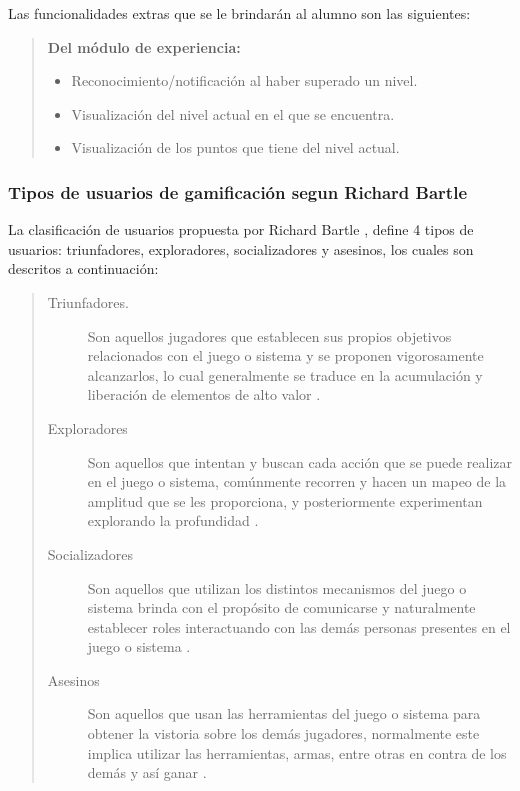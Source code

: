     \noindent
    Las funcionalidades extras que se le brindarán al alumno son las siguientes:

    \begin{quote}
    {\bf Del módulo de experiencia:}
        \begin{itemize}
        \item Reconocimiento/notificación al haber superado un nivel.
        \item Visualización del nivel actual en el que se encuentra.
        \item Visualización de los puntos que tiene del nivel actual.
        \end{itemize}
    \end{quote}

    \subsubsection{Tipos de usuarios de gamificación segun Richard Bartle}

    La clasificación de usuarios propuesta por Richard Bartle \cite{BartleUsuarios}, define
    4 tipos de usuarios: triunfadores, exploradores, socializadores y asesinos, los cuales son
    descritos a continuación:

        \begin{quote}
        \begin{description}
        \item[Triunfadores.]
            Son aquellos jugadores que establecen sus propios objetivos relacionados con
            el juego o sistema y se proponen vigorosamente alcanzarlos, lo cual generalmente
            se traduce en la acumulación y liberación de elementos de alto valor
            \cite[p. 3]{BartleUsuarios}.

        \item[Exploradores]
            Son aquellos que intentan y buscan cada acción que se puede realizar en el
            juego o sistema, comúnmente recorren y hacen un mapeo de la amplitud que se
            les proporciona, y posteriormente experimentan explorando la profundidad
            \cite[p. 4]{BartleUsuarios}.

        \item[Socializadores]
            Son aquellos que utilizan los distintos mecanismos del juego o sistema brinda
            con el propósito de comunicarse y naturalmente establecer roles interactuando
            con las demás personas presentes en el juego o sistema
            \cite[p. 4]{BartleUsuarios}.

        \item[Asesinos]
            Son aquellos que usan las herramientas del juego o sistema para obtener la
            vistoria sobre los demás jugadores, normalmente este implica utilizar las
            herramientas, armas, entre otras en contra de los demás y así ganar
            \cite[p. 4]{BartleUsuarios}.

        \end{description}
        \end{quote}

